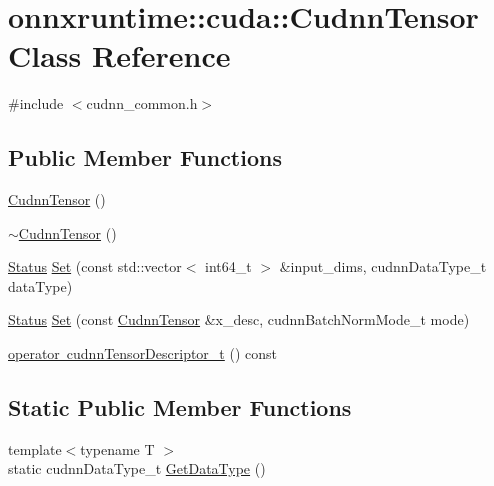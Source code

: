 \hypertarget{classonnxruntime_1_1cuda_1_1CudnnTensor}{}\section{onnxruntime\+:\+:cuda\+:\+:Cudnn\+Tensor Class Reference}
\label{classonnxruntime_1_1cuda_1_1CudnnTensor}


{\ttfamily \#include $<$cudnn\+\_\+common.\+h$>$}

\subsection*{Public Member Functions}
\begin{DoxyCompactItemize}
\item 
\mbox{\hyperlink{classonnxruntime_1_1cuda_1_1CudnnTensor_ab12ccc3b849f360a0a37909df6940b3c}{Cudnn\+Tensor}} ()
\item 
\mbox{\hyperlink{classonnxruntime_1_1cuda_1_1CudnnTensor_a6e299260485ab16bc3d93b54b60c6e67}{$\sim$\+Cudnn\+Tensor}} ()
\item 
\mbox{\hyperlink{classonnxruntime_1_1common_1_1Status}{Status}} \mbox{\hyperlink{classonnxruntime_1_1cuda_1_1CudnnTensor_a04f694f3b72ff6ac06511008d97c451d}{Set}} (const std\+::vector$<$ int64\+\_\+t $>$ \&input\+\_\+dims, cudnn\+Data\+Type\+\_\+t data\+Type)
\item 
\mbox{\hyperlink{classonnxruntime_1_1common_1_1Status}{Status}} \mbox{\hyperlink{classonnxruntime_1_1cuda_1_1CudnnTensor_ac362e34636ab4f8828e578e632b4fbe8}{Set}} (const \mbox{\hyperlink{classonnxruntime_1_1cuda_1_1CudnnTensor}{Cudnn\+Tensor}} \&x\+\_\+desc, cudnn\+Batch\+Norm\+Mode\+\_\+t mode)
\item 
\mbox{\hyperlink{classonnxruntime_1_1cuda_1_1CudnnTensor_ad3505f7bba117518557c347875f4f209}{operator cudnn\+Tensor\+Descriptor\+\_\+t}} () const
\end{DoxyCompactItemize}
\subsection*{Static Public Member Functions}
\begin{DoxyCompactItemize}
\item 
{\footnotesize template$<$typename T $>$ }\\static cudnn\+Data\+Type\+\_\+t \mbox{\hyperlink{classonnxruntime_1_1cuda_1_1CudnnTensor_ac7de44b522d7278beedcaac83ef5da4b}{Get\+Data\+Type}} ()
\end{DoxyCompactItemize}


